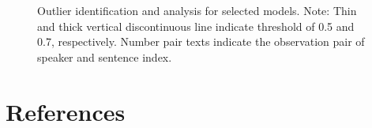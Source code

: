 \documentclass[
sn-apacite
]{sn-jnl}
\begin{document}
\label{cell-fig-rq3-model-outliers}
\begin{figure}[H]


\caption{\label{fig-rq3-model-outliers}Outlier identification and
analysis for selected models. Note: Thin and thick vertical
discontinuous line indicate threshold of 0.5 and 0.7, respectively.
Number pair texts indicate the observation pair of speaker and sentence
index.}

\end{figure}%

\newpage{}

\section*{References}\label{references}
\end{document}
